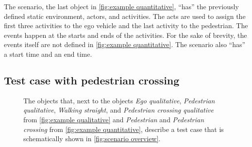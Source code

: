 The scenario, the last object in \cref{fig:example quantitative}, ``has'' the previously defined static environment, actors, and activities. The acts are used to assign the first three activities to the ego vehicle and the last activity to the pedestrian. The events happen at the starts and ends of the activities. For the sake of brevity, the events itself are not defined in \cref{fig:example quantitative}. The scenario also ``has'' a start time and an end time.

\subsection{Test case with pedestrian crossing}
\label{sec:example test case}

\cbend
\begin{figure}
	\centering
	
	\caption{\cbstartc The objects that, next to the objects \emph{Ego qualitative}, \emph{Pedestrian qualitative}, \emph{Walking straight}, and \emph{Pedestrian crossing qualitative} from \cref{fig:example qualitative} and \emph{Pedestrian} and \emph{Pedestrian crossing} from \cref{fig:example quantitative}, describe a test case that is schematically shown in \cref{fig:scenario overview}.\cbend}
	\label{fig:example test case}
\end{figure}
\cbstart


